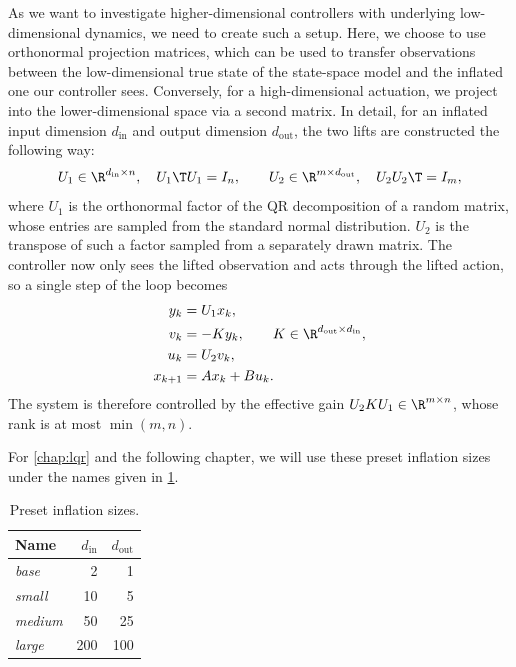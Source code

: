 As we want to investigate higher-dimensional controllers with underlying low-dimensional
dynamics, we need to create such a setup. Here, we choose to use orthonormal projection matrices,
which can be used to transfer observations between the low-dimensional true state of the state-space model
and the inflated one our controller sees. Conversely, for a high-dimensional actuation, we project into the
lower-dimensional space via a second matrix. In detail, for an inflated input dimension $d_{\mathrm{in}}$ and
output dimension $d_{\mathrm{out}}$, the two lifts are constructed the following way:
\begin{equation}
    \label{eq:lifts}
    U_1 \in \R^{d_{\mathrm{in}} \times n}, \quad U_1\T U_1 = I_n,
    \qquad
    U_2 \in \R^{m \times d_{\mathrm{out}}}, \quad U_2 U_2\T = I_m,
\end{equation}
where $U_1$ is the orthonormal factor of the QR decomposition of a random matrix, whose
entries are sampled from the standard normal distribution. $U_2$ is the transpose of such a factor
sampled from a separately drawn matrix.
The controller now only sees the lifted observation and acts through the lifted action, so a single
step of the loop becomes
\begin{subequations}
\label{eq:inflated-loop}
\begin{align}
    y_k     &= U_1 x_k , \label{eq:inflated-obs}\\
    v_k     &= -K y_k , \qquad K \in \R^{d_{\mathrm{out}} \times d_{\mathrm{in}}} , \label{eq:inflated-ctrl}\\
    u_k     &= U_2 v_k , \label{eq:inflated-act}\\
    x_{k+1} &= A x_k + B u_k . \label{eq:inflated-dyn}
\end{align}
\end{subequations}
The system is therefore controlled by the effective gain $U_2 K U_1 \in \R^{m \times n}$, whose rank is at most
$\min(m, n)$.

For \cref{chap:lqr} and the following chapter, we will use these preset inflation sizes under the
names given in \cref{tab:inflation-sizes}.
\begin{table}[htbp]
    \centering
    \caption{Preset inflation sizes.}
    \label{tab:inflation-sizes}
    \begin{tabular}{@{}lrr@{}}
        \toprule
        Name & $d_{\mathrm{in}}$ & $d_{\mathrm{out}}$ \\
        \midrule
        \emph{base}   & 2   & 1   \\
        \emph{small}  & 10  & 5   \\
        \emph{medium} & 50  & 25  \\
        \emph{large}  & 200 & 100 \\
        \bottomrule
    \end{tabular}
\end{table}


